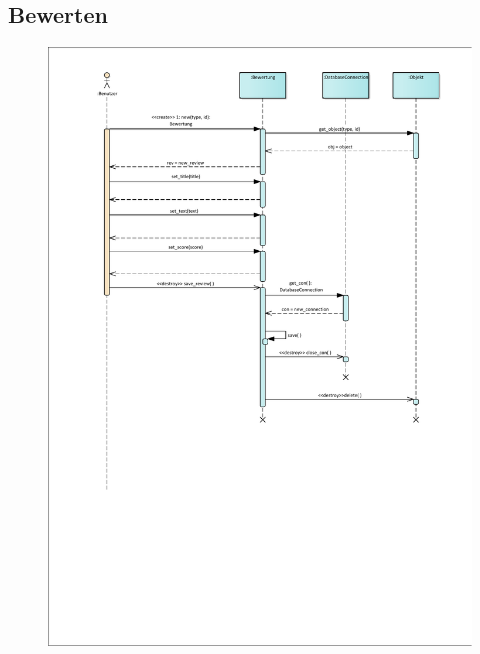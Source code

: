\subsection*{Bewerten}
\begin{figure}[h!]
	\centering
	\includegraphics[width=0.8\linewidth]{docs/6_Sequenzdiagramme/Richard/sequenzdiagramm_bewerten.pdf}
	\label{fig:SeqDia_Bewerten}
\end{figure}

\vfill
\pagebreak

